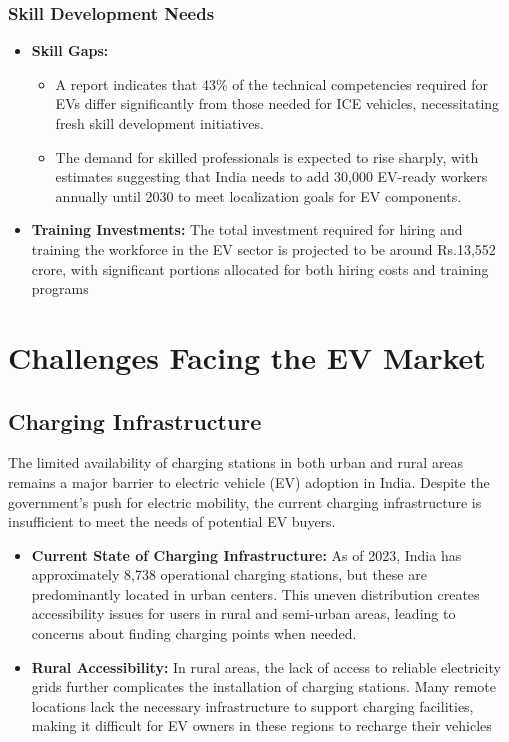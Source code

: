 \documentclass[a4paper,12pt]{report}
\begin{document}
\newpage
\subsection{Skill Development Needs}
\begin{itemize}
    \item \textbf{Skill Gaps: }
    \begin{itemize}
        \item A report indicates that 43\% of the technical competencies required for EVs differ significantly from those needed for ICE vehicles, necessitating fresh skill development initiatives.\cite{EconomicTimes}
        \item The demand for skilled professionals is expected to rise sharply, with estimates suggesting that India needs to add 30,000 EV-ready workers annually until 2030 to meet localization goals for EV components.\cite{EconomicTimes}
    \end{itemize}
    \item \textbf{Training Investments: }
    The total investment required for hiring and training the workforce in the EV sector is projected to be around Rs.13,552 crore, with significant portions allocated for both hiring costs and training programs \cite{EconomicTimes}
\end{itemize}



\chapter{Challenges Facing the EV Market}
\section{Charging Infrastructure}
The limited availability of charging stations in both urban and rural areas remains a major barrier to electric vehicle (EV) adoption in India. Despite the government's push for electric mobility, the current charging infrastructure is insufficient to meet the needs of potential EV buyers.

\begin{itemize}
    \item \textbf{Current State of Charging Infrastructure: }
    As of 2023, India has approximately 8,738 operational charging stations, but these are predominantly located in urban centers. This uneven distribution creates accessibility issues for users in rural and semi-urban areas, leading to concerns about finding charging points when needed.\cite{evPedia}\cite{emobility+}
    \item \textbf{Rural Accessibility: }
    In rural areas, the lack of access to reliable electricity grids further complicates the installation of charging stations. Many remote locations lack the necessary infrastructure to support charging facilities, making it difficult for EV owners in these regions to recharge their vehicles \cite{evPedia}
\end{itemize}
\end{document}
